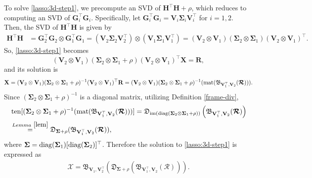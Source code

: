 \documentclass[10pt]{article}  	%
\theoremstyle{definition}
\theoremstyle{definition}
\newcommand{\Rc}{\boldsymbol{{\mathcal{R}}}}
\newcommand{\diag}{{\rm{diag}}}
\DeclareMathOperator*{\im}{{\rm{im}}}
\DeclareMathOperator*{\mat}{{\rm{mat}}}
\DeclareMathOperator*{\ten}{{\rm{ten}}}
\newcommand{\mG}{\mathbf{G}}
\newcommand{\mH}{\mathbf{H}}
\newcommand{\mR}{\mathbf{R}}
\newcommand{\mV}{\mathbf{V}}
\newcommand{\mX}{\mathbf{X}}
\theoremstyle{remark}
\begin{document}
To solve \eqref{lasso:3d-step1}, we precompute an SVD of $\mH^\top \mH+\rho$, which reduces to computing an SVD of $\mG_i^\top\mG_i$. Specifically, let $\mG_i^\top \mG_i = \mV_i \mathbf{\Sigma}_i \mV_i^\top$ for $i=1,2$. Then, the  SVD of $\mH^\top \mH$ is given by
\begin{align}
\mH^\top \mH &= \mG_2^\top \mG_2 \otimes \mG_1^\top \mG_1 = (\mV_2 \mathbf{\Sigma}_2 \mV_2^\top) \otimes (\mV_1 \mathbf{\Sigma}_1 \mV_1^\top) = (\mV_2 \otimes \mV_1)(\mathbf{\Sigma}_2 \otimes \mathbf{\Sigma}_1)(\mV_2 \otimes \mV_1)^\top. 
\end{align}
So, \eqref{lasso:3d-step1} becomes
$$(\mV_2 \otimes \mV_1)(\mathbf{\Sigma}_2 \otimes \mathbf{\Sigma}_1 + \rho)(\mV_2 \otimes \mV_1)^\top \mX=\mR, $$ and its solution is
\begin{align}\label{equ:Xt1}
\mX = (\mV_2 \otimes \mV_1)(\mathbf{\Sigma}_2 \otimes \mathbf{\Sigma}_1 + \rho)^{-1}(\mV_2 \otimes \mV_1)^\top \mR=(\mV_2 \otimes \mV_1)(\mathbf{\Sigma}_2 \otimes \mathbf{\Sigma}_1 + \rho)^{-1}(\mat(\mathfrak{B}_{\mV_1^\top, \mV_2} ( \Rc ))).
\end{align}
Since $(\mathbf{\Sigma}_2 \otimes \mathbf{\Sigma}_1 + \rho)^{-1}$ is a diagonal matrix, utilizing Definition \ref{frame-div},
\begin{align*}
&\ten[(\mathbf{\Sigma}_2 \otimes \mathbf{\Sigma}_1 + \rho)^{-1}(\mat(\mathfrak{B}_{\mV_1^\top, \mV_2} ( \Rc )))]=\mathfrak{D}_{\im(\diag(\mathbf{\Sigma}_2 \otimes \mathbf{\Sigma}_1 + \rho))}\left(\mathfrak{B}_{\mV_1^\top, \mV_2} ( \Rc )\right)\\&\stackrel{Lemma\ \ref{lem}}{=} \mathfrak{D}_{\mathbf{\Sigma} + \rho}(\mathfrak{B}_{\mV_1^\top, \mV_2} ( \boldsymbol{\mathcal{R}} )),
\end{align*}
where $\mathbf{\Sigma} = \diag(\mathbf{\Sigma}_1)[\diag(\mathbf{\Sigma}_2)]^\top $.
Therefore the solution to \eqref{lasso:3d-step1} is expressed as
\begin{align}\label{svd:d}
\mathcal{X} = \mathfrak{B}_{\mV_1, \mV_2^\top} \left( \mathfrak{D}_{\mathbf{\Sigma} + \rho}(\mathfrak{B}_{\mV_1^\top, \mV_2} ( \boldsymbol{\mathcal{R}} )) \right ).
\end{align}
\end{document}
